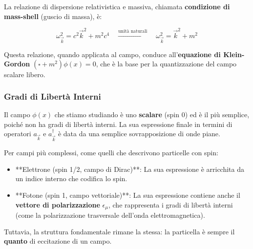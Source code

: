 La relazione di dispersione relativistica e massiva, chiamata \textbf{condizione di mass-shell} (guscio di massa), è:

\begin{equation}
\omega_{\vec{k}}^2 = c^2 \vec{k}^2 + m^2 c^4 \quad \xrightarrow{\text{unità naturali}} \quad \omega_{\vec{k}}^2 = \vec{k}^2 + m^2
\end{equation}

Questa relazione, quando applicata al campo, conduce all'\textbf{equazione di Klein-Gordon} $(\square + m^2) \phi(x) = 0$, che è la base per la quantizzazione del campo scalare libero.

\subsubsection{Gradi di Libertà Interni}

Il campo $\phi(x)$ che stiamo studiando è uno \textbf{scalare} (spin 0) ed è il più semplice, poiché non ha gradi di libertà interni. La sua espressione finale in termini di operatori $a_{\vec{k}}$ e $a_{\vec{k}}^\dagger$ è data da una semplice sovrapposizione di onde piane.

Per campi più complessi, come quelli che descrivono particelle con spin:
\begin{itemize}
    \item **Elettrone (spin 1/2, campo di Dirac)**: La sua espressione è arricchita da un indice interno che codifica lo spin.
    \item **Fotone (spin 1, campo vettoriale)**: La sua espressione contiene anche il \textbf{vettore di polarizzazione} $\epsilon_\mu$, che rappresenta i gradi di libertà interni (come la polarizzazione trasversale dell'onda elettromagnetica).
\end{itemize}
Tuttavia, la struttura fondamentale rimane la stessa: la particella è sempre il \textbf{quanto} di eccitazione di un campo.